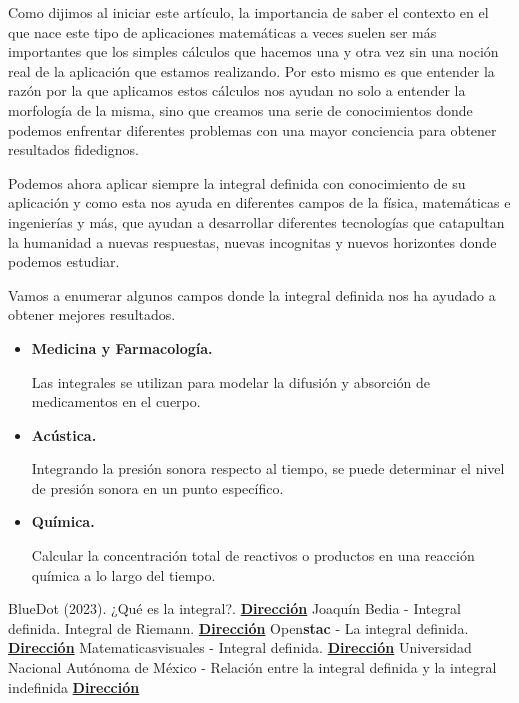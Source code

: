 \documentclass[twocolumn]{article}
\begin{document}
\begin{justify}
  Como dijimos al iniciar este artículo, la importancia de saber el contexto en el que nace este tipo de aplicaciones matemáticas a veces suelen ser más importantes que los simples cálculos que hacemos una y otra vez sin una noción real de la aplicación que estamos realizando. Por esto mismo es que entender la razón por la que
  aplicamos estos cálculos nos ayudan no solo a entender la morfología de la misma, sino que creamos una serie de conocimientos donde podemos enfrentar diferentes problemas con una mayor conciencia para obtener resultados fidedignos.
\end{justify}
\begin{justify}
  Podemos ahora aplicar siempre la integral definida con conocimiento de su aplicación y como esta nos ayuda en diferentes campos de la física, matemáticas e ingenierías y más, que ayudan a desarrollar diferentes tecnologías que catapultan la humanidad a nuevas respuestas, nuevas incognitas y nuevos horizontes donde podemos estudiar.
\end{justify}
\begin{justify}
  Vamos a enumerar algunos campos donde la integral definida nos ha ayudado a obtener mejores resultados.
\end{justify}
\begin{itemize}
  \item \textbf{Medicina y Farmacología.}
  
  Las integrales se utilizan para modelar la difusión y absorción de medicamentos en el cuerpo.

  \item \textbf{Acústica.}
  
  Integrando la presión sonora respecto al tiempo, se puede determinar el nivel de presión sonora en un punto específico.

  \item \textbf{Química.}
  
  Calcular la concentración total de reactivos o productos en una reacción química a lo largo del tiempo.

  
\end{itemize}
\begin{thebibliography}{9}
   BlueDot (2023). ¿Qué es la integral?. \href{https://www.youtube.com/watch?v=y6YQSUDTzqE}{\textbf{Dirección}}
   Joaquín Bedia - Integral definida. Integral de Riemann. \href{https://ocw.unican.es/pluginfile.php/1897/course/section/1562/int.pdf}{\textbf{Dirección}}
   Open\textbf{stac} - La integral definida. \href{https://openstax.org/books/c%C3%A1lculo-volumen-1/pages/5-2-la-integral-definida}{\textbf{Dirección}}
   Matematicasvisuales - Integral definida. \href{https://www.matematicasvisuales.com/html/analisis/integral/integral.html}{\textbf{Dirección}}
   Universidad Nacional Autónoma de México - Relación entre la integral definida y la integral indefinida \href{https://portalacademico.cch.unam.mx/calculo2/la-integral-indefinida/relacion-entre-la-integral-definida-y-la-integral-indefinida}{\textbf{Dirección}}
\end{thebibliography}
\end{document}
